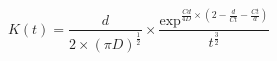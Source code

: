 \begin{equation}
K(t) = \frac{d}{2 \times (\pi D)^{\frac{1}{2}}} \times \frac{\text{exp}^{\frac{Cd}{4D} \times \left(2-\frac{d}{Ct}- \frac{Ct}{d} \right) } }{t^{\frac{3}{2}}}
\end{equation}


